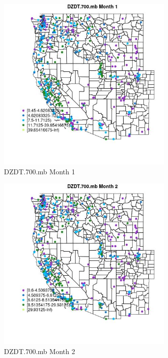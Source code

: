 \begin{figure} 
\centering  
\includegraphics[width=0.77\textwidth]{Code_Outputs/ML_input_report_ML_input_PM25_Step5_part_d_de_duplicated_aves_ML_input_MapObsMo1DZDT700mb.jpg} 
\caption{\label{fig:ML_input_report_ML_input_PM25_Step5_part_d_de_duplicated_aves_ML_inputMapObsMo1DZDT700mb}DZDT.700.mb Month 1} 
\end{figure} 
 

\begin{figure} 
\centering  
\includegraphics[width=0.77\textwidth]{Code_Outputs/ML_input_report_ML_input_PM25_Step5_part_d_de_duplicated_aves_ML_input_MapObsMo2DZDT700mb.jpg} 
\caption{\label{fig:ML_input_report_ML_input_PM25_Step5_part_d_de_duplicated_aves_ML_inputMapObsMo2DZDT700mb}DZDT.700.mb Month 2} 
\end{figure} 
 

